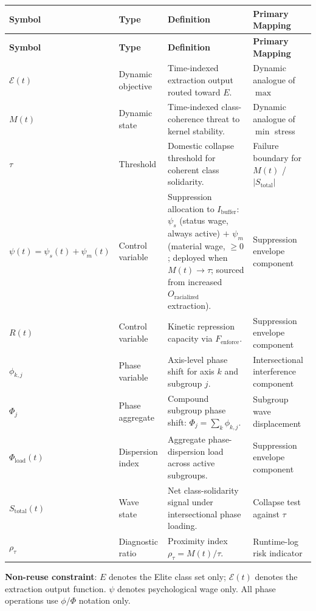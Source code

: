 \documentclass[12pt,openany]{book}
\begin{document}
\begin{longtable}{>{\raggedright}p{2.7cm} >{\raggedright}p{3.2cm} >{\raggedright}p{5.3cm} >{\raggedright\arraybackslash}p{3.3cm}}
\toprule
\textbf{Symbol} & \textbf{Type} & \textbf{Definition} & \textbf{Primary Mapping} \\
\midrule
\endfirsthead
\toprule
\textbf{Symbol} & \textbf{Type} & \textbf{Definition} & \textbf{Primary Mapping} \\
\midrule
\endhead
$\mathcal{E}(t)$ & Dynamic objective & Time-indexed extraction output routed toward $E$. & Dynamic analogue of $\max$ \\
$M(t)$ & Dynamic state & Time-indexed class-coherence threat to kernel stability. & Dynamic analogue of $\min$ stress \\
$\tau$ & Threshold & Domestic collapse threshold for coherent class solidarity. & Failure boundary for $M(t)$ / $|S_{\text{total}}|$ \\
$\psi(t) = \psi_s(t)+\psi_m(t)$ & Control variable & Suppression allocation to $I_{\text{buffer}}$: $\psi_s$ (status wage, always active) $+$ $\psi_m$ (material wage, $\geq 0$; deployed when $M(t)\to\tau$; sourced from increased $O_{\text{racialized}}$ extraction). & Suppression envelope component \\
$R(t)$ & Control variable & Kinetic repression capacity via $F_{\text{enforce}}$. & Suppression envelope component \\
$\phi_{k,j}$ & Phase variable & Axis-level phase shift for axis $k$ and subgroup $j$. & Intersectional interference component \\
$\Phi_j$ & Phase aggregate & Compound subgroup phase shift: $\Phi_j=\sum_k \phi_{k,j}$. & Subgroup wave displacement \\
$\Phi_{\text{load}}(t)$ & Dispersion index & Aggregate phase-dispersion load across active subgroups. & Suppression envelope component \\
$S_{\text{total}}(t)$ & Wave state & Net class-solidarity signal under intersectional phase loading. & Collapse test against $\tau$ \\
$\rho_{\tau}$ & Diagnostic ratio & Proximity index $\rho_{\tau}=M(t)/\tau$. & Runtime-log risk indicator \\
\bottomrule
\end{longtable}

\textbf{Non-reuse constraint}: $E$ denotes the Elite class set only; $\mathcal{E}(t)$ denotes the extraction output function. $\psi$ denotes psychological wage only. All phase operations use $\phi/\Phi$ notation only.
\end{document}
